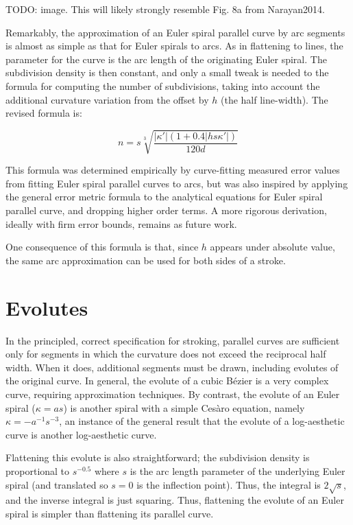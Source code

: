 \documentclass[sigconf, authordraft]{acmart}
\begin{document}
TODO: image. This will likely strongly resemble Fig. 8a from Narayan2014.

Remarkably, the approximation of an Euler spiral parallel curve by arc segments is almost as simple as that for Euler spirals to arcs. As in flattening to lines, the parameter for the curve is the arc length of the originating Euler spiral. The subdivision density is then constant, and only a small tweak is needed to the formula for computing the number of subdivisions, taking into account the additional curvature variation from the offset by $h$ (the half line-width). The revised formula is:

\[
    n = s\sqrt[3]{\frac{|\kappa'|(1+0.4|hs\kappa'|)}{120d}}
\]

This formula was determined empirically by curve-fitting measured error values from fitting Euler spiral parallel curves to arcs, but was also inspired by applying the general error metric formula to the analytical equations for Euler spiral parallel curve, and dropping higher order terms. A more rigorous derivation, ideally with firm error bounds, remains as future work.

One consequence of this formula is that, since $h$ appears under absolute value, the same arc approximation can be used for both sides of a stroke.


\section{Evolutes}

In the principled, correct specification for stroking\cite{Nehab2020}, parallel curves are sufficient only for segments in which the curvature does not exceed the reciprocal half width. When it does, additional segments must be drawn, including evolutes of the original curve. In general, the evolute of a cubic Bézier is a very complex curve, requiring approximation techniques. By contrast, the evolute of an Euler spiral ($\kappa = as$) is another spiral with a simple Cesàro equation, namely $\kappa = -a^{-1}s^{-3}$, an instance of the general result that the evolute of a log-aesthetic curve is another log-aesthetic curve\cite{Yoshida2012}.

Flattening this evolute is also straightforward; the subdivision density is proportional to $s^{-0.5}$ where $s$ is the arc length parameter of the underlying Euler spiral (and translated so $s = 0$ is the inflection point). Thus, the integral is $2\sqrt{s}$, and the inverse integral is just squaring. Thus, flattening the evolute of an Euler spiral is simpler than flattening its parallel curve.
\end{document}
